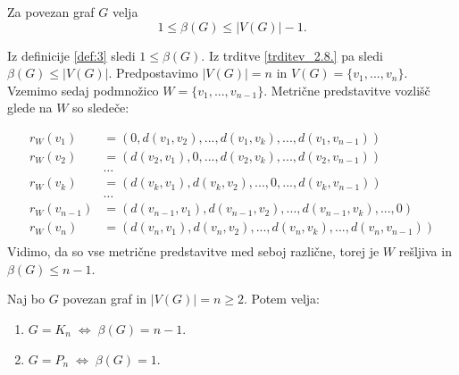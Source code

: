 \documentclass[mat1, tisk]{fmfdelo}
\begin{document}
\begin{posledica}
    Za povezan graf $G$ velja 
    $$1 \leq \beta(G) \leq |V(G)| - 1. $$
\end{posledica}
\begin{dokaz}
    Iz definicije \ref{def:3} sledi $1 \leq \beta(G)$. Iz trditve \ref{trditev_2.8.} 
    pa sledi $\beta(G) \leq |V(G)|.$ Predpostavimo $|V(G)| = n$ in $V(G) = \{ v_1, ... , v_n\}$. 
    Vzemimo sedaj podmnožico $W = \{ v_1, ... , v_{n-1}\}.$
    Metrične predstavitve vozlišč glede na $W$ so sledeče:

    \begin{align*}
        r_W(v_1) & = (0, d(v_1, v_2), ..., d(v_1, v_k), ... , d(v_1, v_{n-1})) \\
        r_W(v_2) & = (d(v_2, v_1), 0, ..., d(v_2, v_k), ... , d(v_2, v_{n-1})) \\
        & \dots \\
        r_W(v_k) & = (d(v_k, v_1), d(v_k, v_2), ..., 0 , ... , d(v_k, v_{n-1})) \\
        & \dots \\
        r_W(v_{n-1}) & = (d(v_{n-1}, v_1), d(v_{n-1}, v_2), ... , d(v_{n-1}, v_k) , ..., 0) \\
        r_W(v_n) & = (d(v_n, v_1), d(v_n, v_2), ...,  d(v_n, v_k), ... , d(v_n, v_{n-1})) \\
    \end{align*}
    Vidimo, da so vse metrične predstavitve med seboj različne, torej je $W$ rešljiva in 
    $\beta(G) \leq n - 1.$ 
\end{dokaz}

\begin{trditev} \label{trditev_2.10.}
    Naj bo $G$ povezan graf in $|V(G)| = n \geq 2.$ Potem velja:
    \begin{enumerate}
        \item $G = K_n \; \Leftrightarrow \; \beta(G) = n - 1.$
        \item $G = P_n \; \Leftrightarrow \; \beta(G) = 1.$
    \end{enumerate} 
\end{trditev}
\end{document}
